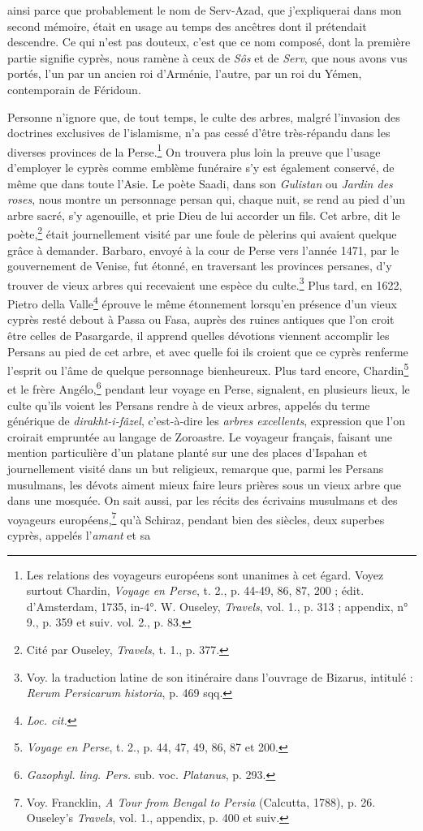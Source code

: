 \documentclass{article}
\begin{document}
ainsi parce que probablement le nom de Serv-Azad, que j'expliquerai dans mon second mémoire, était en usage au temps des ancêtres dont il prétendait descendre. Ce qui n'est pas douteux, c'est que ce nom composé, dont la première partie signifie cyprès, nous ramène à ceux de \emph{Sôs} et de \emph{Serv}, que nous avons vus portés, l'un par un ancien roi d'Arménie, l'autre, par un roi du Yémen, contemporain de Féridoun.

Personne n'ignore que, de tout temps, le culte des arbres, malgré l'invasion des doctrines exclusives de l'islamisme, n'a pas cessé d'être très-répandu dans les diverses provinces de la Perse.\footnote{Les relations des voyageurs européens sont unanimes à cet égard. Voyez surtout Chardin, \emph{Voyage en Perse}, t. 2., p. 44-49, 86, 87, 200 ; édit. d'Amsterdam, 1735, in-4°. W. Ouseley, \emph{Travels}, vol. 1., p. 313 ; appendix, n° 9., p. 359 et suiv. vol. 2., p. 83.} On trouvera plus loin la preuve que l'usage d'employer le cyprès comme emblème funéraire s'y est également conservé, de même que dans toute l'Asie. Le poète Saadi, dans son \emph{Gulistan} ou \emph{Jardin des roses}, nous montre un personnage persan qui, chaque nuit, se rend au pied d'un arbre sacré, s'y agenouille, et prie Dieu de lui accorder un fils. Cet arbre, dit le poète,\footnote{Cité par Ouseley, \emph{Travels}, t. 1., p. 377.} était journellement visité par une foule de pèlerins qui avaient quelque grâce à demander. Barbaro, envoyé à la cour de Perse vers l'année 1471, par le gouvernement de Venise, fut étonné, en traversant les provinces persanes, d'y trouver de vieux arbres qui recevaient une espèce du culte.\footnote{Voy. la traduction latine de son itinéraire dans l'ouvrage de Bizarus, intitulé : \emph{Rerum Persicarum historia}, p. 469 sqq.} Plus tard, en 1622, Pietro della Valle\footnote{\emph{Loc. cit.}} éprouve le même étonnement lorsqu'en présence d'un vieux cyprès resté debout à Passa ou Fasa, auprès des ruines antiques que l'on croit être celles de Pasargarde, il apprend quelles dévotions viennent accomplir les Persans au pied de cet arbre, et avec quelle foi ils croient que ce cyprès renferme l'esprit ou l'âme de quelque personnage bienheureux. Plus tard encore, Chardin\footnote{\emph{Voyage en Perse}, t. 2., p. 44, 47, 49, 86, 87 et 200.} et le frère Angélo,\footnote{\emph{Gazophyl. ling. Pers.} sub. voc. \emph{Platanus}, p. 293.} pendant leur voyage en Perse, signalent, en plusieurs lieux, le culte qu'ils voient les Persans rendre à de vieux arbres, appelés du terme générique de \emph{dirakht-i-fâzel}, c'est-à-dire les \emph{arbres excellents}, expression que l'on croirait empruntée au langage de Zoroastre. Le voyageur français, faisant une mention particulière d'un platane planté sur une des places d'Ispahan et journellement visité dans un but religieux, remarque que, parmi les Persans musulmans, les dévots aiment mieux faire leurs prières sous un vieux arbre que dans une mosquée. On sait aussi, par les récits des écrivains musulmans et des voyageurs européens,\footnote{Voy. Francklin, \emph{A Tour from Bengal to Persia} (Calcutta, 1788), p. 26. Ouseley's \emph{Travels}, vol. 1., appendix, p. 400 et suiv.} qu'à Schiraz, pendant bien des siècles, deux superbes cyprès, appelés l'\emph{amant} et sa 
\end{document}
